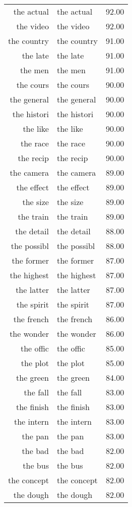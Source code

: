 \begin{table}[ht]
\begin{tabular}{rlr}
  the actual & the actual & 92.00 \\ 
  the video & the video & 92.00 \\ 
  the country & the country & 91.00 \\ 
  the late & the late & 91.00 \\ 
  the men & the men & 91.00 \\ 
  the cours & the cours & 90.00 \\ 
  the general & the general & 90.00 \\ 
  the histori & the histori & 90.00 \\ 
  the like & the like & 90.00 \\ 
  the race & the race & 90.00 \\ 
  the recip & the recip & 90.00 \\ 
  the camera & the camera & 89.00 \\ 
  the effect & the effect & 89.00 \\ 
  the size & the size & 89.00 \\ 
  the train & the train & 89.00 \\ 
  the detail & the detail & 88.00 \\ 
  the possibl & the possibl & 88.00 \\ 
  the former & the former & 87.00 \\ 
  the highest & the highest & 87.00 \\ 
  the latter & the latter & 87.00 \\ 
  the spirit & the spirit & 87.00 \\ 
  the french & the french & 86.00 \\ 
  the wonder & the wonder & 86.00 \\ 
  the offic & the offic & 85.00 \\ 
  the plot & the plot & 85.00 \\ 
  the green & the green & 84.00 \\ 
  the fall & the fall & 83.00 \\ 
  the finish & the finish & 83.00 \\ 
  the intern & the intern & 83.00 \\ 
  the pan & the pan & 83.00 \\ 
  the bad & the bad & 82.00 \\ 
  the bus & the bus & 82.00 \\ 
  the concept & the concept & 82.00 \\ 
  the dough & the dough & 82.00 \\ 

\end{tabular}
\end{table}
